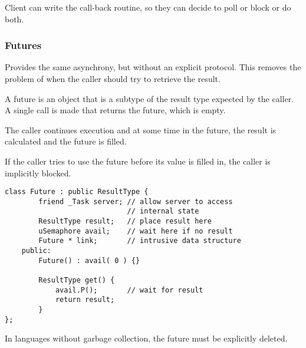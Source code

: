 \documentclass[11pt]{article}
\begin{document}
Client can write the call-back routine, so they can decide to poll or
block or do both.
\subsubsection{Futures}
\label{sec:orge29eb1d}
Provides the same asynchrony, but without an explicit protocol.
This removes the problem of when the caller should try to retrieve the result.

A future is an object that is a subtype of the result type expected by the caller.
A single call is made that returns the future, which is empty.

The caller continues execution and at some time in the future, the result is calculated and
the future is filled.

If the caller tries to use the future before its value is filled in, the caller is
implicitly blocked.

\begin{verbatim}
class Future : public ResultType {
        friend _Task server; // allow server to access
                             // internal state
        ResultType result;   // place result here
        uSemaphore avail;    // wait here if no result
        Future * link;       // intrusive data structure
    public:
        Future() : avail( 0 ) {}

        ResultType get() {
            avail.P();       // wait for result
            return result;
        }
};
\end{verbatim}
In languages without garbage collection, the future must be explicitly deleted.
\end{document}
